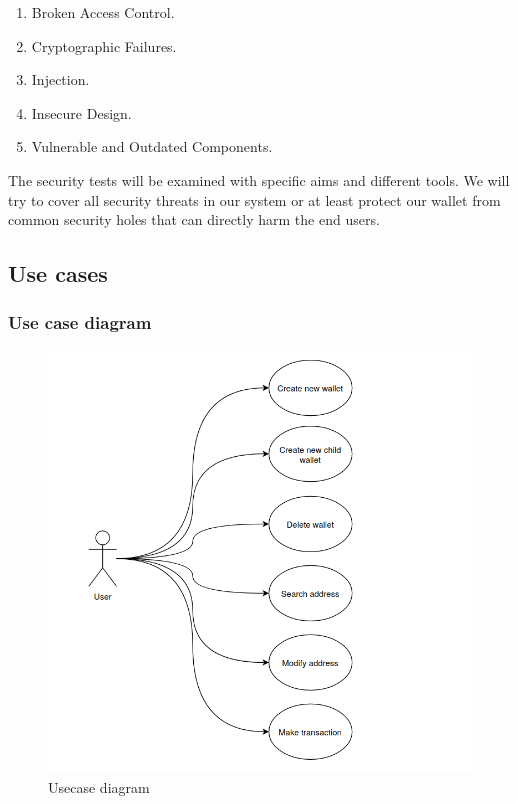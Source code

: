 \begin{enumerate}
    \item Broken Access Control.
    \item Cryptographic Failures.
    \item Injection.
    \item Insecure Design.
    \item Vulnerable and Outdated Components.
\end{enumerate}

The security tests will be examined with specific aims and different tools. We will try to cover all security threats in our system or at least protect our wallet from common security holes that can directly harm the end users.


\subsection{Use cases}

\subsubsection{Use case diagram}

\begin{figure}[!ht]
    \centering
    \includegraphics[width=1\textwidth]{images/usecases.png}
    \caption[Usecase diagram]{Usecase diagram}
    \label{fig:usecases}
\end{figure}

